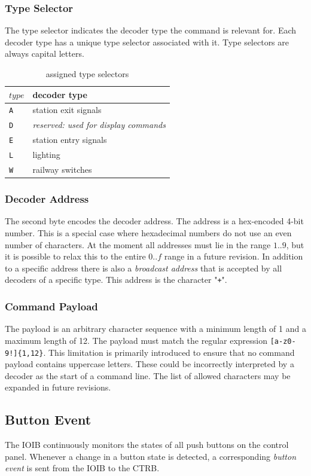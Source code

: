 \documentclass{scrreprt}
\begin{document}
\subsubsection{Type Selector}
The type selector indicates the decoder type the command is relevant for.
Each decoder type has a unique type selector associated with it.
Type selectors are always capital letters.
\begin{table}[h!]
\centering
\begin{tabular}{ |l|l| }
\hline
$type$ & decoder type \\\hline\hline
\texttt{A} & station exit signals \\\hline
\texttt{D} & \emph{reserved: used for display commands} \\\hline
\texttt{E} & station entry signals \\\hline
\texttt{L} & lighting \\\hline
\texttt{W} & railway switches \\\hline
\end{tabular}
\caption{assigned type selectors}
\end{table}

\subsubsection{Decoder Address}
The second byte encodes the decoder address.
The address is a hex-encoded 4-bit number.
This is a special case where hexadecimal numbers do not use an even number of characters.
At the moment all addresses must lie in the range $1..9$, but it is possible to relax this to the entire $0..f$ range in a future revision.
In addition to a specific address there is also a \emph{broadcast address} that is accepted by all decoders of a specific type.
This address is the character "\texttt{+}".

\subsubsection{Command Payload}
The payload is an arbitrary character sequence with a minimum length of 1 and a maximum length of 12.
The payload must match the regular expression \texttt{[a-z0-9!]\{1,12\}}.
This limitation is primarily introduced to ensure that no command payload contains uppercase letters.
These could be incorrectly interpreted by a decoder as the start of a command line.
The list of allowed characters may be expanded in future revisions.

\subsection{Button Event}
The IOIB continuously monitors the states of all push buttons on the control panel.
Whenever a change in a button state is detected, a corresponding \emph{button event} is sent from the IOIB to the CTRB.
\end{document}
